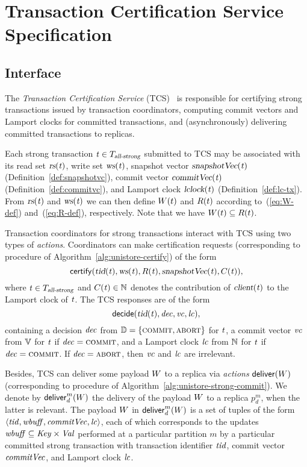 
\section{Transaction Certification Service Specification} \label{section:tcs}

\subsection{Interface} \label{ss:interface}

The \emph{Transaction Certification Service} (TCS)~\cite{discpaper}
is responsible for certifying strong transactions issued by transaction coordinators,
computing commit vectors and Lamport clocks for committed transactions,
and (asynchronously) delivering committed transactions to replicas.

Each strong transaction $\mathit{t} \in T_{\textsl{all-strong}}$ submitted to TCS
may be associated with its read set $\textsl{rs}(\mathit{t})$, write set $\textsl{ws}(\mathit{t})$,
snapshot vector $\textsl{snapshotVec}(\mathit{t})$ (Definition~\ref{def:snapshotvc}),
commit vector $\textsl{commitVec}(\mathit{t})$ (Definition~\ref{def:commitvc}),
and Lamport clock $\textsl{lclock}(\mathit{t})$ (Definition~\ref{def:lc-tx}).
From $\textsl{rs}(\mathit{t})$ and $\textsl{ws}(\mathit{t})$ we can then define 
$W(t)$ and $R(t)$ according to~(\ref{eq:W-def}) and~(\ref{eq:R-def}), respectively.
Note that we have $W(t) \subseteq R(t)$.

Transaction coordinators for strong transactions interact with TCS
using two types of \emph{actions}. Coordinators can make certification requests
(corresponding to procedure \certify{} of Algorithm~\ref{alg:unistore-certify})
of the form
\[
  {\sf certify}(\textsl{tid}(\mathit{t}), \textsl{ws}(\mathit{t}), R(\mathit{t}),
    \textsl{snapshotVec}(\mathit{t}), C(\mathit{t})),
\]
where $\mathit{t} \in T_{\textsl{all-strong}}$ and $C(\mathit{t}) \in \mathbb{N}$
denotes the contribution of $\textsl{client}(\mathit{t})$ to the Lamport clock of $\mathit{t}$.
The TCS responses are of the form
\[
  {\sf decide}(\textsl{tid}(\mathit{t}), \mathit{dec}, \mathit{vc}, \mathit{lc}),
\]
containing a decision $\mathit{dec}$ from $\mathbb{D} = \{\textsc{commit}, \textsc{abort}\}$ for $\mathit{t}$,
a commit vector $\mathit{vc}$ from $\mathbb{V}$ for $\mathit{t}$ if $\mathit{dec} = \textsc{commit}$,
and a Lamport clock $\mathit{lc}$ from $\mathbb{N}$ for $\mathit{t}$ if $\mathit{dec} = \textsc{commit}$.
If $\mathit{dec} = \textsc{abort}$, then $\mathit{vc}$ and $\mathit{lc}$ are irrelevant.

Besides, TCS can deliver some payload $W$
to a replica via \upcall \emph{actions} ${\sf deliver}(W)$
(corresponding to procedure \deliverupdates{}
of Algorithm~\ref{alg:unistore-strong-commit}).
We denote by ${\sf deliver}^{m}_{d}(W)$ the delivery of the payload $W$ to
a replica $p^{m}_{d}$, when the latter is relevant.
The payload $W$ in ${\sf deliver}^{m}_{d}(W)$ is a set of tuples of the form
$\langle \mathit{tid}, \mathit{wbuff}, \mathit{commitVec}, \mathit{lc} \rangle$,
each of which corresponds to the updates $\mathit{wbuff} \subseteq \mathit{Key} \times \mathit{Val}$
performed at a particular partition $m$
by a particular committed strong transaction
with transaction identifier $\mathit{tid}$, commit vector $\mathit{commitVec}$,
and Lamport clock $\mathit{lc}$.
